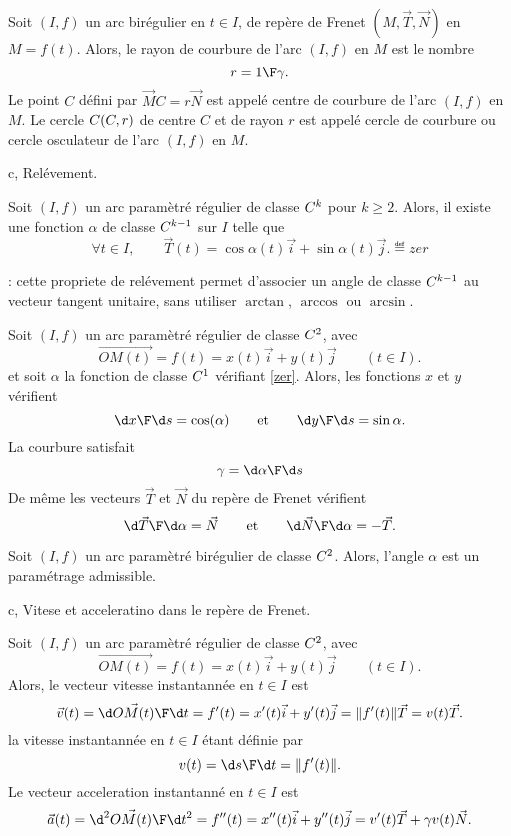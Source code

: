 \Definition []  Soit $(I,f)$ un arc birégulier en $t\in I$, 
de repère de Frenet $(M,\vec T,\vec N)$ en $M=f(t)$. 
Alors, le rayon de courbure de l'arc $(I,f)$ en $M$ est le nombre 
$$
r={1\F \gamma}.
$$ 
Le point $C$ défini par $\vec MC=r\vec N$ 
est appelé centre de courbure de l'arc $(I,f)$ en $M$. \medskip\noindent
Le cercle $\sc C(C,r)$ de centre $C$ et de rayon $r$ est appelé cercle de courbure 
ou cercle osculateur de l'arc $(I,f)$ en $M$. 
\bigskip

\Section c, Relévement.


\Propriete []  Soit $(I,f)$ un arc paramètré régulier de classe $\sc C^k$ pour $k\ge2$. 
Alors, il existe une fonction $\alpha$ de classe $\sc C^{k-1}$ sur $I$ telle que 
$$
\forall t\in I, \qquad \vec T(t)=\cos\alpha(t)\vec i+\sin\alpha(t)\vec j. \eqdef{zer}
$$

\Remarque : cette propriete de relévement permet d'associer un angle de classe $\sc C^{k-1}$ au vecteur tangent unitaire, 
sans utiliser $\arctan$, $\arccos$ ou $\arcsin$. 
\bigskip


\Propriete []  Soit $(I,f)$ un arc paramètré régulier de classe $\sc C^2$, avec 
$$
\vec{OM(t)}=f(t)=x(t)\vec i+y(t)\vec j\qquad (t\in I). 
$$
et soit $\alpha$ la fonction de classe $\sc C^1$ vérifiant \eqref{zer}. 
Alors, les fonctions $x$ et $y$ vérifient 
$$
{\d x\F\d s}=\cos(\alpha)\qquad \mbox{et}\qquad {\d y\F\d s}=\sin\alpha.
$$ 
La courbure satisfait
$$
\gamma={\d\alpha\F\d s}
$$
De même les vecteurs $\vec T$ et $\vec N$ du repère de Frenet vérifient
$$
{\d\vec T\F\d\alpha}=\vec N\qquad\mbox{et}\qquad{\d\vec N\F\d\alpha}=-\vec T.
$$

\Propriete []  Soit $(I,f)$ un arc paramètré birégulier de classe $\sc C^2$. Alors, 
l'angle $\alpha$ est un paramétrage admissible. 



\Section c, Vitese et acceleratino dans le repère de Frenet. 

\Propriete []  Soit $(I,f)$ un arc paramètré régulier de classe $\sc C^2$, avec 
$$
\vec{OM(t)}=f(t)=x(t)\vec i+y(t)\vec j\qquad (t\in I). 
$$
Alors, le vecteur vitesse instantannée en $t\in I$ est 
$$
\vec v(t)={\d\vec{OM(t)}\F \d t}=f'(t)=x'(t)\vec i+y'(t)\vec j=\|f'(t)\|\vec T=v(t)\vec T.
$$
la vitesse instantannée en $t\in I$ étant définie par 
$$
v(t)={\d s\F\d t}=\|f'(t)\|.
$$
Le vecteur acceleration instantanné en $t\in I$ est 
$$
\vec a(t)={\d^2\vec{OM(t)}\F \d t^2}=f''(t)=x''(t)\vec i+y''(t)\vec j=v'(t)\vec T+\gamma v(t)\vec N.
$$







